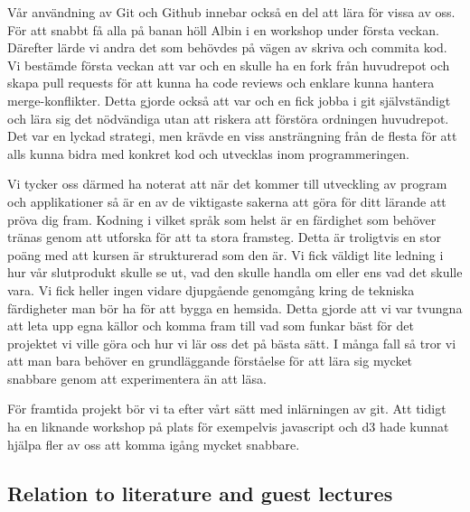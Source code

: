 \documentclass{scrartcl}
\begin{document}
Vår användning av Git och Github innebar också en del att lära för vissa av oss. För att snabbt få alla på banan höll Albin i en workshop under första veckan. Därefter lärde vi andra det som behövdes på vägen av skriva och commita kod. Vi bestämde första veckan att var och en skulle ha en fork från huvudrepot och skapa pull requests för att kunna ha code reviews och enklare kunna hantera merge-konflikter. Detta gjorde också att var och en fick jobba i git självständigt och lära sig det nödvändiga utan att riskera att förstöra ordningen huvudrepot. Det var en lyckad strategi, men krävde en viss ansträngning från de flesta för att alls kunna bidra med konkret kod och utvecklas inom programmeringen. 


Vi tycker oss därmed ha noterat att när det kommer till utveckling av program och applikationer så är en av de viktigaste sakerna att göra för ditt lärande att pröva dig fram. Kodning i vilket språk som helst är en färdighet som behöver tränas genom att utforska för att ta stora framsteg. Detta är troligtvis en stor poäng med att kursen är strukturerad som den är. Vi fick väldigt lite ledning i hur vår slutprodukt skulle se ut, vad den skulle handla om eller ens vad det skulle vara. Vi fick heller ingen vidare djupgående genomgång kring de tekniska färdigheter man bör ha för att bygga en hemsida. Detta gjorde att vi var tvungna att leta upp egna källor och komma fram till vad som funkar bäst för det projektet vi ville göra och hur vi lär oss det på bästa sätt. I många fall så tror vi att man bara behöver en grundläggande förståelse för att lära sig mycket snabbare genom att experimentera än att läsa. 

För framtida projekt bör vi ta efter vårt sätt med inlärningen av git. Att tidigt ha en liknande workshop på plats för exempelvis javascript och d3 hade kunnat hjälpa fler av oss att komma igång mycket snabbare. 

\subsection{Relation to literature and guest lectures}
\end{document}
